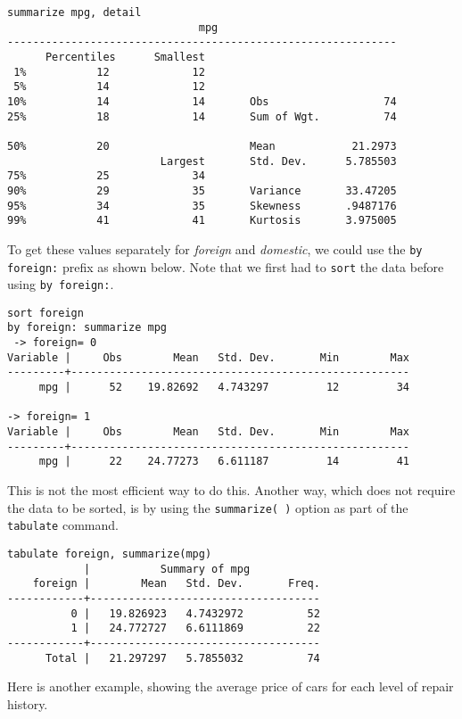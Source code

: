 \begin{lstlisting}
summarize mpg, detail
                              mpg
-------------------------------------------------------------
      Percentiles      Smallest
 1%           12             12
 5%           14             12
10%           14             14       Obs                  74
25%           18             14       Sum of Wgt.          74

50%           20                      Mean            21.2973
                        Largest       Std. Dev.      5.785503
75%           25             34
90%           29             35       Variance       33.47205
95%           34             35       Skewness       .9487176
99%           41             41       Kurtosis       3.975005
\end{lstlisting}

To get these values separately for \textit{foreign} and \textit{domestic}, we could use the \lstinline{by foreign:} prefix as shown below. Note that we first had to \lstinline{sort} the data before using \lstinline{by foreign:}.

\begin{lstlisting}
sort foreign
by foreign: summarize mpg
 -> foreign= 0
Variable |     Obs        Mean   Std. Dev.       Min        Max
---------+-----------------------------------------------------
     mpg |      52    19.82692   4.743297         12         34

-> foreign= 1
Variable |     Obs        Mean   Std. Dev.       Min        Max
---------+-----------------------------------------------------
     mpg |      22    24.77273   6.611187         14         41
\end{lstlisting}


This is not the most efficient way to do this. Another way, which does not require the data to be sorted, is by using the \lstinline{summarize( )} option as part of the \lstinline{tabulate} command.

\begin{lstlisting}
tabulate foreign, summarize(mpg)
            |           Summary of mpg
    foreign |        Mean   Std. Dev.       Freq.
------------+------------------------------------
          0 |   19.826923   4.7432972          52
          1 |   24.772727   6.6111869          22
------------+------------------------------------
      Total |   21.297297   5.7855032          74
\end{lstlisting}

Here is another example, showing the average price of cars for each level of repair history.

